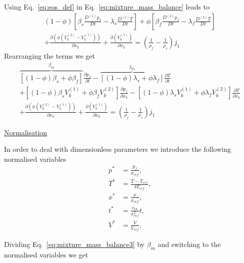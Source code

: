 \documentclass[]{scrreprt}
\begin{document}
Using Eq.~\ref{eq:eos_def} in Eq.~\ref{eq:mixture_mass_balance} leads to
\begin{multline}
  \label{eq:mixture_mass_balance2}
  (1-\phi) \left[ \beta_s \frac{D^{(1)}p_f}{Dt} - \lambda_s\frac{D^{(1)}T}{Dt}  \right] + \phi \left[ \beta_f \frac{D^{(2)}p_f}{Dt} - \lambda_f\frac{D^{(2)}T}{Dt}  \right] \\
  + \frac{\partial( \phi (V^{(2)}_k -V^{(1)}_k))}{\partial x_k}+ \frac{\partial(V^{(1)}_k)}{\partial x_k}  = \left(\frac{1}{\rho_f} - \frac{1}{\rho_s}\right)j_1
\end{multline}
Rearranging the terms we get
\begin{multline}
  \label{eq:mixture_mass_balance3}
  \overbrace{\left[(1-\phi)\beta_s + \phi\beta_f\right]}^{\beta_m}  \frac{\partial p_f}{\partial t} 
  - \overbrace{\left[(1-\phi)\lambda_s + \phi\lambda_f\right]}^{\lambda_m} \frac{\partial T}{\partial t} \\
  + \left[(1-\phi)\beta_s V^{(1)}_k + \phi\beta_f V^{(2)}_k \right] \frac{\partial p_f}{\partial x_k} 
  - \left[(1-\phi)\lambda_s V^{(1)}_k + \phi\lambda_f V^{(2)}_k \right] \frac{\partial T}{\partial x_k} \\
  + \frac{\partial( \phi (V^{(2)}_k -V^{(1)}_k))}{\partial x_k}+ \frac{\partial(V^{(1)}_k)}{\partial x_k}  = \left(\frac{1}{\rho_f} - \frac{1}{\rho_s}\right)j_1
\end{multline}

\underline{Normalisation}

In order to deal with dimensionless parameters we introduce the following normalised variables
\begin{subequations}
  \label{eq:def_normalisations}
  \begin{align}
  p^* &= \frac{p_f}{\sigma_{ref}}, \\   
  T^* &= \frac{T-T_{ref}}{\delta T_{ref}}, \\   
  x^* &= \frac{x}{x_{ref}}, \\   
  t^* &= \frac{c_{th}}{x^2_{ref}}t, \\   
  V^* &= \frac{V}{V_{ref}}.
  \end{align}
\end{subequations}

Dividing Eq.~\ref{eq:mixture_mass_balance3} by $\beta_m$ and switching to the normalised variables we get
\end{document}
